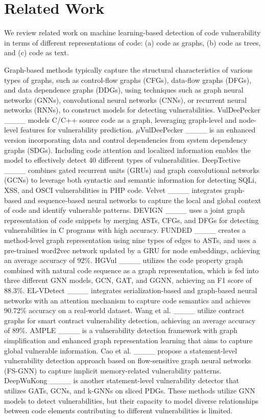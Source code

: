 \section{Related Work}
We review related work on machine learning-based detection of code vulnerability in terms of different representations of code: (a) code as graphs, (b) code as trees, and (c) code as text.  


Graph-based methods typically capture the structural characteristics of various types of graphs, such as control-flow graphs (CFGs), data-flow graphs (DFGs), and data dependence graphs (DDGs), using techniques such as graph neural networks (GNNs), convolutional neural networks (CNNs), or recurrent neural networks (RNNs), to construct models for detecting vulnerabilities. VulDeePecker ____ models C/C++ source code as a graph, leveraging graph-level and node-level features for vulnerability prediction. $\mu$VulDeePecker ____ is an enhanced version incorporating data and control dependencies from system dependency graphs (SDGs). Including code attention and localized information enables the model to effectively detect 40 different types of vulnerabilities. DeepTective ____  combines gated recurrent units (GRUs) and graph convolutional networks (GCNs) to leverage both syntactic and semantic information for detecting SQLi, XSS, and OSCI vulnerabilities in PHP code. Velvet ____ integrates graph-based and sequence-based neural networks to capture the local and global context of code and identify vulnerable patterns. DEVIGN ____ uses a joint graph representation of code snippets by merging ASTs, CFGs, and DFGs for detecting vulnerabilities in C programs with high accuracy. FUNDED ____ creates a method-level graph representation using nine types of edges to ASTs, and uses a pre-trained word2vec network updated by a GRU for node embeddings, achieving an average accuracy of 92\%. HGVul ____ utilizes the code property graph combined with natural code sequence as a graph representation, which is fed into three different GNN models, GCN, GAT, and GGNN, achieving an F1 score of 88.3\%. EL-VDetect ____ integrates serialization-based and graph-based neural networks with an attention mechanism to capture code semantics and achieves 90.72\% accuracy on a real-world dataset. Wang et al. ____ utilize contract graphs for smart contract vulnerability detection, achieving an average accuracy of 89\%. AMPLE ____ is a vulnerability detection framework with graph simplification and enhanced graph representation learning that aims to capture global vulnerable information. Cao et al. ____ propose a statement-level vulnerability detection approach based on flow-sensitive graph neural networks (FS-GNN) to capture implicit memory-related vulnerability patterns. DeepWuKong ____ is another statement-level vulnerability detector that utilizes GATs, GCNs, and k-GNNs on sliced PDGs. These methods utilize GNN models to detect vulnerabilities, but their capacity to model diverse relationships between code elements contributing to different vulnerabilities is limited.

